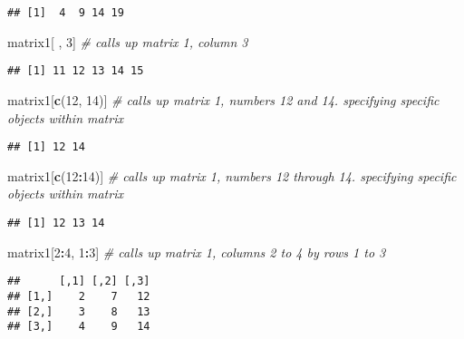\documentclass[]{article}
\newenvironment{Shaded}{\begin{snugshade}}{\end{snugshade}}
\newcommand{\KeywordTok}[1]{\textcolor[rgb]{0.13,0.29,0.53}{\textbf{#1}}}
\newcommand{\DecValTok}[1]{\textcolor[rgb]{0.00,0.00,0.81}{#1}}
\newcommand{\CommentTok}[1]{\textcolor[rgb]{0.56,0.35,0.01}{\textit{#1}}}
\newcommand{\OperatorTok}[1]{\textcolor[rgb]{0.81,0.36,0.00}{\textbf{#1}}}
\newcommand{\NormalTok}[1]{#1}
\begin{document}
\begin{verbatim}
## [1]  4  9 14 19
\end{verbatim}

\begin{Shaded}
\begin{Highlighting}[]
\NormalTok{matrix1[ , }\DecValTok{3}\NormalTok{] }\CommentTok{# calls up matrix 1, column 3}
\end{Highlighting}
\end{Shaded}

\begin{verbatim}
## [1] 11 12 13 14 15
\end{verbatim}

\begin{Shaded}
\begin{Highlighting}[]
\NormalTok{matrix1[}\KeywordTok{c}\NormalTok{(}\DecValTok{12}\NormalTok{, }\DecValTok{14}\NormalTok{)] }\CommentTok{# calls up matrix 1, numbers 12 and 14. specifying specific objects within matrix}
\end{Highlighting}
\end{Shaded}

\begin{verbatim}
## [1] 12 14
\end{verbatim}

\begin{Shaded}
\begin{Highlighting}[]
\NormalTok{matrix1[}\KeywordTok{c}\NormalTok{(}\DecValTok{12}\OperatorTok{:}\DecValTok{14}\NormalTok{)] }\CommentTok{# calls up matrix 1, numbers 12 through 14. specifying specific objects within matrix}
\end{Highlighting}
\end{Shaded}

\begin{verbatim}
## [1] 12 13 14
\end{verbatim}

\begin{Shaded}
\begin{Highlighting}[]
\NormalTok{matrix1[}\DecValTok{2}\OperatorTok{:}\DecValTok{4}\NormalTok{, }\DecValTok{1}\OperatorTok{:}\DecValTok{3}\NormalTok{] }\CommentTok{# calls up matrix 1, columns 2 to 4 by rows 1 to 3}
\end{Highlighting}
\end{Shaded}

\begin{verbatim}
##      [,1] [,2] [,3]
## [1,]    2    7   12
## [2,]    3    8   13
## [3,]    4    9   14
\end{verbatim}
\end{document}
